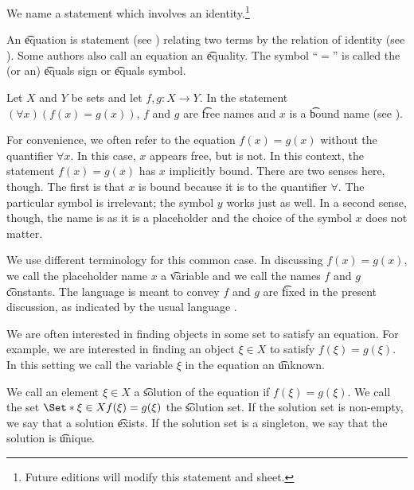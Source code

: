 

We name a statement which involves an identity.\footnote{Future editions will modify this statement and sheet.}


An \t{equation} is statement (see ) relating two terms by the relation of identity (see ).
Some authors also call an equation an \t{equality}.
The symbol ``$=$'' is called the (or an) \t{equals sign} or \t{equals symbol}.


Let $X$ and $Y$ be sets and let $f,g: X \to Y$.
In the statement $(\forall x)(f(x) = g(x))$, $f$ and $g$ are \t{free} names and $x$ is a \t{bound} name (see ).

For convenience, we often refer to the equation $f(x) = g(x)$ without the quantifier $\forall x$.
In this case, $x$ appears free, but is not.
In this context, the statement $f(x) = g(x)$ has $x$ implicitly bound.
There are two senses here, though.
The first is that $x$ is bound because it is  to the quantifier $\forall$.
The particular symbol is irrelevant; the symbol $y$ works just as well.
In a second sense, though, the name is  as it is a placeholder and the choice of the symbol $x$ does not matter.

We use different terminology for this common case.
In discussing $f(x) = g(x)$, we call the placeholder name $x$ a \t{variable} and we call the names $f$ and $g$ \t{constants}.
The language is meant to convey $f$ and $g$ are \t{fixed} in the present discussion, as indicated by the usual language .


We are often interested in finding objects in some set to satisfy an equation.
For example, we are interested in finding an object $\xi \in X$ to satisfy $f(\xi) = g(\xi)$.
In this setting we call the variable $\xi$ in the equation an \t{unknown}.

We call an element $\xi \in X$ a \t{solution} of the equation if $f(\xi) = g(\xi)$.
We call the set $\Set*{\xi \in X}{f(\xi) = g(\xi)}$ the \t{solution set}.
If the solution set is non-empty, we say that a solution \t{exists}.
If the solution set is a singleton, we say that the solution is \t{unique}.

